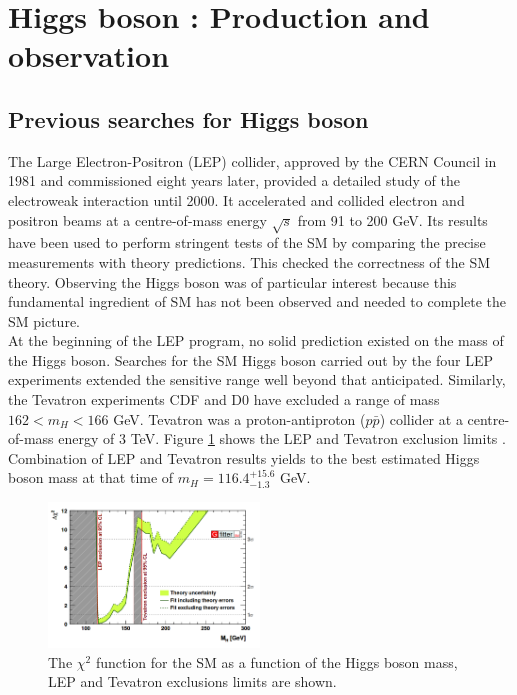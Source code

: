 \section{Higgs boson : Production and observation}
\label{chap1:H2012}

\subsection{Previous searches for Higgs boson}

The Large Electron-Positron (LEP) collider, approved by the CERN Council in 1981 and commissioned eight years later, provided a detailed study of the electroweak interaction until 2000. It accelerated and collided electron and positron beams at a centre-of-mass energy $\sqrt{s}$ from 91 to 200 GeV. Its results have been used to perform stringent tests of the SM by comparing the precise measurements with theory predictions. This checked the correctness of the SM theory. Observing the Higgs boson was of particular interest because this fundamental ingredient of SM has not been observed and needed to complete the SM picture. \\
At the beginning of the LEP program, no solid prediction existed on the mass of the Higgs boson. Searches for the SM Higgs boson carried out by the four LEP experiments extended the sensitive range well beyond that anticipated. Similarly, the Tevatron experiments CDF and D0 have excluded a range of mass $162 < m_{H} < 166$ GeV. Tevatron was a proton-antiproton ($p\bar{p}$) collider at a centre-of-mass energy of 3 TeV. Figure \ref{fig:chap1:H2012:LEP} shows the LEP and Tevatron exclusion limits \cite{LEP, Tevatron, LEP_Tevatron}. Combination of LEP and Tevatron results yields to the best estimated Higgs boson mass at that time of $m_{H} = 116.4^{+15.6}_{-1.3}$ GeV. 
\begin{figure}[htbp]
    \centering
    \includegraphics[width=0.5\textwidth]{Ch1/Img/LEP_Tevatron_limits.png}
    \caption{The $\chi^2$ function for the SM as a function of the Higgs boson mass, LEP and Tevatron exclusions limits are shown.}
    \label{fig:chap1:H2012:LEP}
\end{figure}
